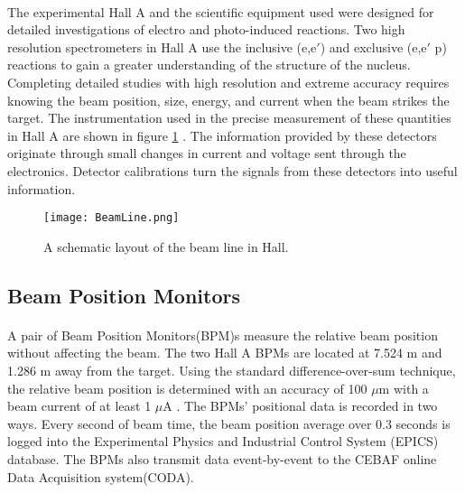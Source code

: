 	 \paragraph{}The experimental Hall A and the scientific equipment used were designed for detailed investigations of electro and photo-induced reactions. Two high resolution spectrometers in Hall A use the inclusive (e,e$\prime$) and exclusive (e,e$\prime$ p) reactions to gain a greater understanding of the structure of the nucleus. Completing detailed studies with high resolution and extreme accuracy requires knowing the beam position, size, energy, and current when the beam strikes the target. The instrumentation used in the precise measurement of these quantities in Hall A  are shown in figure \ref{BeamLine} \cite{HallA}. The information provided by these detectors originate through small changes in current and voltage sent through the electronics. Detector calibrations turn the signals from these detectors into useful information.
	 
	 \begin{figure}[t]
	 	\centering
	 	\texttt{[image: BeamLine.png]} 
	 		 	\caption{A schematic layout of the beam line in Hall. \cite{HallA} }
	 	\label{BeamLine}
	 \end{figure} 	
	 
 
	 \subsection{Beam Position Monitors}
	 \paragraph{} A pair of Beam Position Monitors(BPM)s measure the relative beam position without affecting the beam. The two Hall A BPMs are located at 7.524 m and 1.286 m away from the target. Using the standard difference-over-sum technique, the relative beam position is determined with an accuracy of 100 $\mu$m with a beam current of at least 1 $\mu$A \cite{HallA}. The BPMs' positional data is recorded in two ways. Every second of beam time, the beam position average over 0.3 seconds is logged into the Experimental Physics and Industrial Control System (EPICS) database. The BPMs also transmit data event-by-event to the CEBAF online Data Acquisition system(CODA).
	 	 	 

